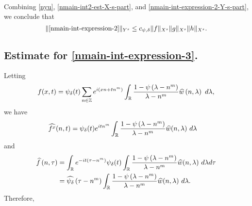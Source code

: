%
%
Combining \eqref{nyu}, \eqref{nmain-int2-est-X-s-part}, and
\eqref{nmain-int-expression-2-Y-s-part}, we conclude that
%
%
%
%
\begin{equation}
	\label{nmain-int2-est}
	\begin{split}
		\|\eqref{nmain-int-expression-2}\|_{Y^s} \le c_{\psi, \delta}\|f\|_{X^s} \|g\|_{X^s}\|h\|_{X^s}.
	\end{split}
\end{equation}
%
%
\subsection{Estimate for
\texorpdfstring{\eqref{nmain-int-expression-3}}{Expression 3}.}
Letting $$f(x,t) = \psi_{\delta}(t) \sum_{n \in \mathbb{Z}} e^{i\left( xn + tn^{m} \right)} 
\int_{\mathbb{R}} \frac{1 - \psi\left( \lambda - n^{m} \right)}{\lambda - n^{m}} 
\widehat{w} \left( n, \lambda \right) \ d \lambda,$$ we have
%
%
\begin{equation*}
	\begin{split}
		& \widehat{f^x}(n, t) = \psi_{\delta}(t) e^{itn^{m}} \int_{\mathbb{R}}
		\frac{1 - \psi\left( \lambda - n^{m} \right)}{\lambda - n^{m}} 
		\widehat{w}(n, \lambda) \ d \lambda
	\end{split}
\end{equation*}
and
\begin{equation*}
	\begin{split}
		 \widehat{f}\left( n, \tau \right)
		 & = \int_{\mathbb{R}} e^{-it\left( \tau - n^{m} 
		\right)} \psi_{\delta}(t) \int_{\mathbb{R}} \frac{1 - \psi\left( 
		\lambda - n^{m} 
		\right)}{\lambda - n^{m}} \widehat{w}(n, \lambda) \ d \lambda d \tau
		\\
    & = \widehat{\psi_{\delta}}\left( \tau - n^{m} \right) \int_{\mathbb{R}} 
		\frac{1 - \psi\left( 
		\lambda - n^{m} 
		\right)}{\lambda - n^{m}} \widehat{w}(n, \lambda) \ d \lambda.
	\end{split}
\end{equation*}
Therefore,
%
%
